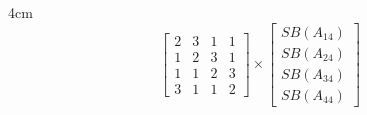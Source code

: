 \documentclass{beamer}
\begin{document}
{\begin{columns}
\begin{column}{4cm}
\begin{equation*}	
\begin{bmatrix} 
2 & 3 & 1 & 1 \\
1 & 2 & 3 & 1 \\
1 & 1 & 2 & 3 \\
3 & 1 & 1 & 2 
\end{bmatrix}\times
\begin{bmatrix} 
SB(A_{14}) \\
SB(A_{24}) \\
SB(A_{34}) \\
SB(A_{44})  
\end{bmatrix}
\end{equation*}
\end{column}
\end{columns}
	
}
\end{document}
